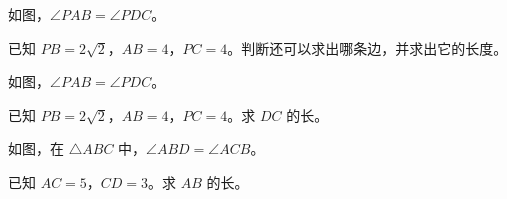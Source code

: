 \documentclass{exam-zh}
\begin{document}

\begin{problem}[points=10]
  \noindent
  \begin{minipage}[t]{\dimexpr\linewidth-60mm-6mm\relax}
    \vspace{0pt}
    如图，$\angle PAB=\angle PDC$。

已知 $PB=2\sqrt{2}$，$AB=4$，$PC=4$。判断还可以求出哪条边，并求出它的长度。
    
  \end{minipage}\hfill
  \begin{diagramcoltikz}{60mm}{}
  }
  \end{diagramcoltikz}
  \par\medskip
  \answerarea[54mm]
\end{problem}



\begin{problem}[points=10]
  \noindent
  \begin{minipage}[t]{\dimexpr\linewidth-60mm-6mm\relax}
    \vspace{0pt}
    如图，$\angle PAB=\angle PDC$。

已知 $PB=2\sqrt{2}$，$AB=4$，$PC=4$。求 $DC$ 的长。
    
  \end{minipage}\hfill
  \begin{diagramcoltikz}{60mm}{}
  }
  \end{diagramcoltikz}
  \par\medskip
  \answerarea[54mm]
\end{problem}



\begin{problem}[points=10]
  \noindent
  \begin{minipage}[t]{\dimexpr\linewidth-60mm-6mm\relax}
    \vspace{0pt}
    如图，在 $\triangle ABC$ 中，$\angle ABD=\angle ACB$。

已知 $AC=5$，$CD=3$。求 $AB$ 的长。
    
  \end{minipage}\hfill
  \begin{diagramcoltikz}{60mm}{}
  }
  \end{diagramcoltikz}
  \par\medskip
  \answerarea[54mm]
\end{problem}
\end{document}
